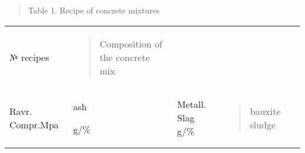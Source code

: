 \begin{quote}
Table 1. Recipe of concrete mixtures
\end{quote}

\begin{quote}
\end{quote}

\begin{longtable}[]{@{}
  >{\raggedright\arraybackslash}p{}
  >{\raggedright\arraybackslash}p{}
  >{\raggedright\arraybackslash}p{}
  >{\raggedright\arraybackslash}p{}
  >{\raggedright\arraybackslash}p{}@{}}
\toprule\noalign{}
& & & & \\
\midrule\noalign{}
\endhead
\bottomrule\noalign{}
\endlastfoot
№ recipes & \begin{quote}
Composition of the concrete mix
\end{quote} & & & \\
Ravr. Compr.Mpa

\begin{quote}
\end{quote} & ash

g/\% & Metall. Slag g/\% & \begin{quote}
bauxite sludge
\end{quote}


\end{longtable}
